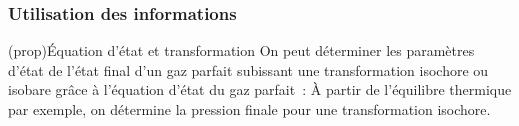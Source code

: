 \documentclass[../../main/main.tex]{subfiles}
\begin{document}
\subsubsection{Utilisation des informations}

\begin{tcb*}(prop){Équation d'état et transformation}
	On peut déterminer les paramètres d'état de l'état final d'un gaz parfait
	subissant une transformation isochore ou isobare grâce à l'équation d'état du
	gaz parfait~:
	\psw{
		\[
			\frac{P_iV_i}{T_i} = \frac{P_fV_f}{T_f}
			\Ra
			\left\{
			\begin{array}{rclr}
				P_f & = & \DS P_i \frac{T_f}{T_i} & \quad \text{isochore}
				\\
				V_f & = & \DS V_i \frac{T_i}{T_i} & \quad \text{isobare}
			\end{array}
			\right.
		\]
	}
	À partir de l'équilibre thermique par exemple, on détermine la pression
	finale pour une transformation isochore.
\end{tcb*}
\end{document}
